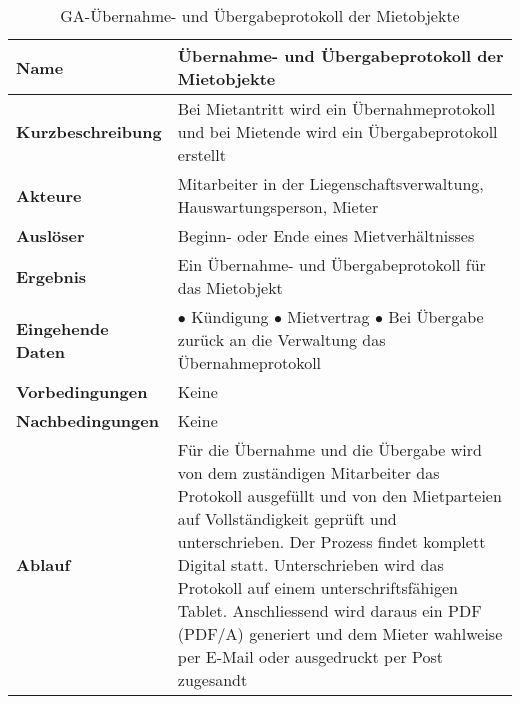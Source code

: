 \begin{table}[H]
  \centering
  \settowidth{}
  \setlength\extrarowheight{2pt}
  \begin{tabulary}{1.0\textwidth}{|a|m{12cm}|}
    \hline
    \textbf{Name}& Übernahme- und Übergabeprotokoll der Mietobjekte\\
    \hline 
    \textbf{Kurzbeschreibung} & Bei Mietantritt wird ein Übernahmeprotokoll und bei Mietende wird ein Übergabeprotokoll erstellt\\
    \hline
    \textbf{Akteure} & Mitarbeiter in der Liegenschaftsverwaltung, Hauswartungsperson, Mieter\\
    \hline
    \textbf{Auslöser} & Beginn- oder Ende eines Mietverhältnisses\\
    \hline
    \textbf{Ergebnis} & Ein Übernahme- und Übergabeprotokoll für das Mietobjekt\\
    \hline
    \textbf{Eingehende Daten} &  
      $\bullet$ Kündigung \newline
      $\bullet$ Mietvertrag \newline
      $\bullet$ Bei Übergabe zurück an die Verwaltung das Übernahmeprotokoll\\
    \hline
    \textbf{Vorbedingungen} & Keine\\
    \hline
    \textbf{Nachbedingungen} & Keine\\
    \hline
    \textbf{Ablauf} & Für die Übernahme und die Übergabe wird von dem zuständigen Mitarbeiter das Protokoll ausgefüllt und von den Mietparteien auf Vollständigkeit geprüft und unterschrieben. Der Prozess findet komplett Digital statt. Unterschrieben wird das Protokoll auf einem unterschriftsfähigen Tablet. Anschliessend wird daraus ein PDF (PDF/A) generiert und dem Mieter wahlweise per E-Mail oder ausgedruckt per Post zugesandt\\
    \hline
  \end{tabulary}
  \caption{GA-Übernahme- und Übergabeprotokoll der Mietobjekte}
\end{table}

